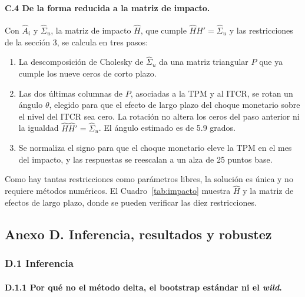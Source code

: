 \documentclass[12pt,letterpaper]{article}
\newcommand{\rutacuadros}{cuadros/}
\newcommand{\cuadro}[1]{}
\begin{document}
\cuadro{cuadro_coeficientes}
\cuadro{cuadro_coeficientes_exogenas}
\cuadro{cuadro_sigma}

\paragraph{C.4 De la forma reducida a la matriz de impacto.} Con $\hat A_i$ y $\hat\Sigma_u$, la matriz de impacto $\hat H$, que cumple $\hat H \hat H' = \hat\Sigma_u$ y las restricciones de la sección 3, se calcula en tres pasos:
\begin{enumerate}[leftmargin=1.5em, itemsep=2pt, topsep=4pt]
\item La descomposición de Cholesky de $\hat\Sigma_u$ da una matriz triangular $P$ que ya cumple los nueve ceros de corto plazo.
\item Las dos últimas columnas de $P$, asociadas a la TPM y al ITCR, se rotan un ángulo $\theta$, elegido para que el efecto de largo plazo del choque monetario sobre el nivel del ITCR sea cero. La rotación no altera los ceros del paso anterior ni la igualdad $\hat H \hat H' = \hat\Sigma_u$. El ángulo estimado es de 5.9 grados.
\item Se normaliza el signo para que el choque monetario eleve la TPM en el mes del impacto, y las respuestas se reescalan a un alza de 25 puntos base.
\end{enumerate}
Como hay tantas restricciones como parámetros libres, la solución es única y no requiere métodos numéricos. El Cuadro~\ref{tab:impacto} muestra $\hat H$ y la matriz de efectos de largo plazo, donde se pueden verificar las diez restricciones.

\cuadro{cuadro_impacto}

\subsection*{Anexo D. Inferencia, resultados y robustez}

\subsubsection*{D.1 Inferencia}

\paragraph{D.1.1 Por qué no el método delta, el bootstrap estándar ni el \textit{wild}.}
\end{document}
